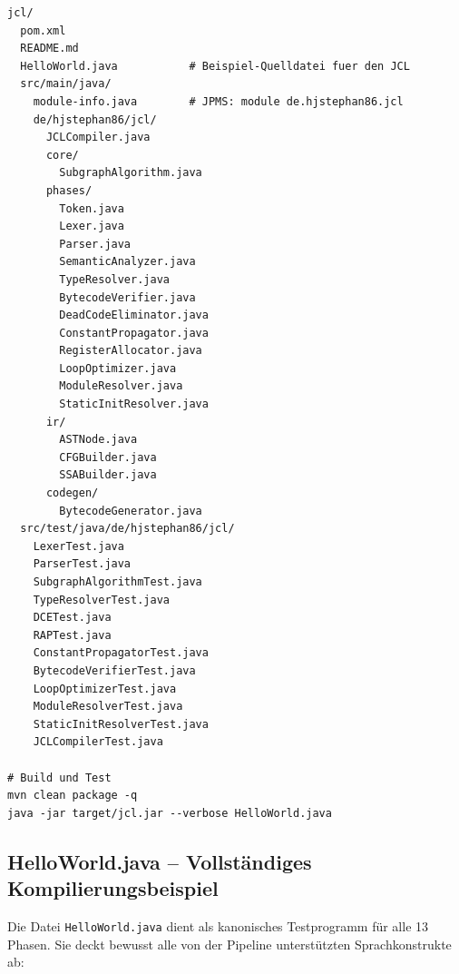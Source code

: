 ﻿\documentclass[a4paper,12pt]{article}
\theoremstyle{definition}
\begin{document}
\begin{lstlisting}[style=bashstyle,
    caption={Projektstruktur und Maven-Build}]
jcl/
  pom.xml
  README.md
  HelloWorld.java           # Beispiel-Quelldatei fuer den JCL
  src/main/java/
    module-info.java        # JPMS: module de.hjstephan86.jcl
    de/hjstephan86/jcl/
      JCLCompiler.java
      core/
        SubgraphAlgorithm.java
      phases/
        Token.java
        Lexer.java
        Parser.java
        SemanticAnalyzer.java
        TypeResolver.java
        BytecodeVerifier.java
        DeadCodeEliminator.java
        ConstantPropagator.java
        RegisterAllocator.java
        LoopOptimizer.java
        ModuleResolver.java
        StaticInitResolver.java
      ir/
        ASTNode.java
        CFGBuilder.java
        SSABuilder.java
      codegen/
        BytecodeGenerator.java
  src/test/java/de/hjstephan86/jcl/
    LexerTest.java
    ParserTest.java
    SubgraphAlgorithmTest.java
    TypeResolverTest.java
    DCETest.java
    RAPTest.java
    ConstantPropagatorTest.java
    BytecodeVerifierTest.java
    LoopOptimizerTest.java
    ModuleResolverTest.java
    StaticInitResolverTest.java
    JCLCompilerTest.java

# Build und Test
mvn clean package -q
java -jar target/jcl.jar --verbose HelloWorld.java
\end{lstlisting}

\subsection{HelloWorld.java -- Vollst\"andiges Kompilierungsbeispiel}

Die Datei \texttt{HelloWorld.java} dient als kanonisches
Testprogramm f\"ur alle 13 Phasen.  Sie deckt bewusst alle
von der Pipeline unterst\"utzten Sprachkonstrukte ab:
\end{document}
